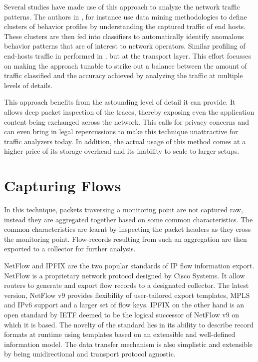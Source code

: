 Several studies have made use of this approach to analyze the network traffic patterns. The authors in \cite{kxu:2005}, for instance use data mining methodologies to define clusters of behavior profiles by understanding the captured traffic of end hosts.  These clusters are then fed into classifiers to  automatically identify anomalous behavior patterns that are of interest to network operators. Similar profiling of end-hosts traffic in performed in \cite{tkaragiannis:2005}, but at the transport layer. This effort focusses on making the approach tunable to strike out a balance between the amount of traffic classified and the accuracy achieved by analyzing the traffic at multiple levels of details. 

This approach benefits from the astounding level of detail it can provide. It allows deep packet inspection of the traces, thereby exposing even the application content being exchanged across the network. This calls for privacy concerns  and can even bring in legal repercussions to make this technique unattractive for traffic analyzers today. In addition, the actual usage of this method comes at a higher price of its storage overhead and its inability to scale to larger setups.

\section{Capturing Flows}\label{sec:capturing-flows}
In this technique, packets traversing a monitoring point are not captured raw, instead they are aggregated together based on some common characteristics. The common characteristics are learnt by inspecting the packet headers as they cross the monitoring point. Flow-records resulting from such an aggregation are then exported to a collector for further analysis. 

NetFlow and \ac{IPFIX} are the two popular standards of \ac{IP} flow information export. NetFlow \cite{rfc3954} is a proprietary network protocol designed by Cisco Systems. It  allow routers to generate and export flow records to a designated collector. The latest version, NetFlow v$9$ provides flexibility of user-tailored export templates, \ac{MPLS} and \ac{IP}v$6$ support and a larger set of flow keys. \ac{IPFIX} \cite{rfc5101} on the other hand is an open standard by \ac{IETF} deemed to be the logical successor of NetFlow v$9$ on which it is based. The novelty of  the standard lies in its ability to describe record formats at runtime using templates based on an extensible and well-defined information model. The data transfer mechanism is also simplistic and extensible by being unidirectional and transport protocol agnostic.  

